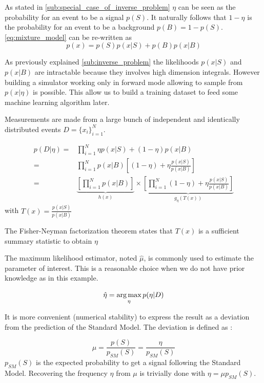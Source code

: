As stated in \autoref{sub:special_case_of_inverse_problem} $\eta$ can be seen as the probability for an event to be a signal $p(S)$. 
It naturally follows that $1-\eta$ is the probability for an event to be a background $p(B)=1-p(S)$.
\autoref{eq:mixture_model} can be re-written as
\begin{equation}
	p(x) = p(S)p(x|S) + p(B)p(x|B)
\end{equation}

As previously explained \autoref{sub:inverse_problem} the likelihoods $p(x|S)$ and $p(x|B)$ are intractable because they involves high dimension integrals.
However building a simulator working only in forward mode allowing to sample from $p(x|\eta)$ is possible.
This allow us to build a training dataset to feed some machine learning algorithm later.

Measurements are made from a large bunch of independent and identically distributed events $D=\{x_i\}_{i=1}^N$.

\begin{align*}
	p(D|\eta) =& \prod_{i=1}^N \eta p(x|S) + (1-\eta) p(x|B) \\
	       =& \prod_{i=1}^N p(x|B) \left [(1-\eta) + \eta \frac{p(x|S)}{p(x|B)} \right ]\\
\label{eq:Fisher-Neyman}
	       =& \underbrace{\left[ \prod_{i=1}^N p(x|B) \right ]}_{h(x)} \times 
	       \underbrace{\left [\prod_{i=1}^N (1-\eta) + \eta \frac{p(x|S)}{p(x|B)} \right ]}_{g_\eta(T(x))}
\end{align*}
with $T(x) = \frac{p(x|S)}{p(x|B)} $

The Fisher-Neyman factorization theorem \needcite states that $T(x)$ is a sufficient summary statistic to obtain $\eta$

The maximum likelihood estimator, noted $\hat \mu$, is commonly used to estimate the parameter of interest.
This is a reasonable choice when we do not have prior knowledge as in this example.

\begin{equation}
	\hat \eta = \operatorname*{arg\,max}_\eta p(\eta | D)
\end{equation}

It is more convenient (numerical stability) to express the result as a deviation from the prediction of the Standard Model.
The deviation is defined as :

\begin{equation}
	\mu = \frac{p(S)}{p_{SM}(S)} = \frac{\eta}{p_{SM}(S)}
\end{equation}
$p_{SM}(S)$ is the expected probability to get a signal following the Standard Model.
Recovering the frequency $\eta$ from $\mu$ is trivially done with $\eta = \mu p_{SM}(S)$.

